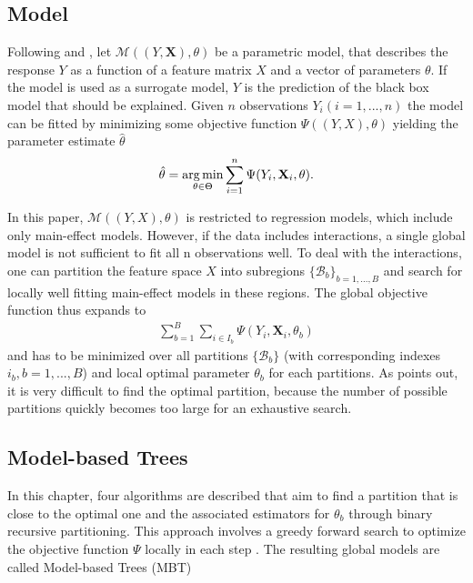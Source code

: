 \subsection{Model}
Following \citep{Zeileis.2008} and \citep{Seibold.2016}, let $\mathcal{M}((Y, \mathbf{X}), \theta)$ be a parametric model, that describes the response $Y$ as a function of a feature matrix $X$  and a vector of parameters $\theta$. If the model is used as a surrogate model, $Y$ is the prediction of the black box model that should be explained. Given $n$ observations $Y_i(i = 1,...,n)$ the model can be fitted by minimizing some objective function $\Psi((Y, X), \theta)$ yielding the parameter estimate $\hat{\theta}$
\begin{align}
    \hat{\theta} = \operatorname*{arg\,min}_{\theta \in \Theta} \sum_{i=1}^{n}\Psi(Y_{i}, \mathbf{X}_{i}, \theta).
\end{align}

In this paper, $\mathcal{M}((Y, X), \theta)$ is restricted to regression models, which include only main-effect models. However, if the data includes interactions, a single global model is not sufficient to fit all n observations well.  To deal with the interactions, one can partition the feature space $X$ into subregions $\{\mathcal{B}_b\}_{b = 1,...,B}$ and search for locally well fitting main-effect models in these regions. The global objective function thus expands to
\begin{align}
    \sum_{b=1}^B\sum_{i \in I_b}\Psi(Y_{i}, \mathbf{X}_{i}, \theta_b)
\end{align}
and has to be minimized over all partitions $\{\mathcal{B}_b\}$ (with corresponding indexes $i_b, b = 1,...,B$) and local optimal parameter $\theta_b$ for each partitions. As \citep{Zeileis.2008} points out, it is very difficult to find the optimal partition, because the number of possible partitions quickly becomes too large for an exhaustive search.





\subsection{Model-based Trees}
In this chapter, four algorithms are described that aim to find a partition that is close to the optimal one and the associated estimators for $\theta_b$ through binary recursive partitioning. This approach involves a greedy forward search to optimize the objective function $\Psi$ locally in each step \citep{Zeileis.2008}.  
The resulting global models are called Model-based Trees (MBT)



